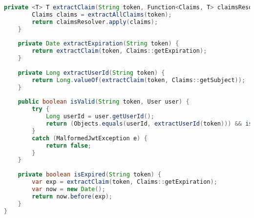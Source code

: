 \begin{lstlisting}[language=java]
	private <T> T extractClaim(String token, Function<Claims, T> claimsResolver) {
		Claims claims = extractAllClaims(token);
		return claimsResolver.apply(claims);
	}
	
	private Date extractExpiration(String token) {
		return extractClaim(token, Claims::getExpiration);
	}
	
	private Long extractUserId(String token) {
		return Long.valueOf(extractClaim(token, Claims::getSubject));
	}
	
	public boolean isValid(String token, User user) {
		try {
			Long userId = user.getUserId();
			return (Objects.equals(userId, extractUserId(token))) && isExpired(token);
		}
		catch (MalformedJwtException e) {
			return false;
		}
	}
	
	private boolean isExpired(String token) {
		var exp = extractClaim(token, Claims::getExpiration);
		var now = new Date();
		return now.before(exp);
	}
}
\end{lstlisting}
\fi
